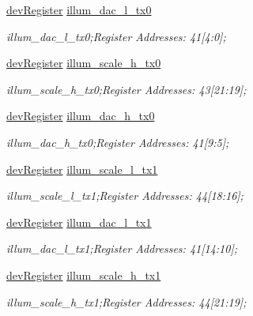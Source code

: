 \begin{DoxyCompactItemize}
\mbox{\hyperlink{classdev_register}{dev\+Register}} \mbox{\hyperlink{class_o_p_t3101_registers_a101ff3855c63d5e6ded77bd6a9614ecb}{illum\+\_\+dac\+\_\+l\+\_\+tx0}}
\begin{DoxyCompactList}\small\item\em illum\+\_\+dac\+\_\+l\+\_\+tx0;Register Addresses\+: 41\mbox{[}4\+:0\mbox{]}; \end{DoxyCompactList}\item 
\mbox{\hyperlink{classdev_register}{dev\+Register}} \mbox{\hyperlink{class_o_p_t3101_registers_a8fa23b509719062c47c69c06cc535e23}{illum\+\_\+scale\+\_\+h\+\_\+tx0}}
\begin{DoxyCompactList}\small\item\em illum\+\_\+scale\+\_\+h\+\_\+tx0;Register Addresses\+: 43\mbox{[}21\+:19\mbox{]}; \end{DoxyCompactList}\item 
\mbox{\hyperlink{classdev_register}{dev\+Register}} \mbox{\hyperlink{class_o_p_t3101_registers_a3b273a77372cdd60faf67f440fc88643}{illum\+\_\+dac\+\_\+h\+\_\+tx0}}
\begin{DoxyCompactList}\small\item\em illum\+\_\+dac\+\_\+h\+\_\+tx0;Register Addresses\+: 41\mbox{[}9\+:5\mbox{]}; \end{DoxyCompactList}\item 
\mbox{\hyperlink{classdev_register}{dev\+Register}} \mbox{\hyperlink{class_o_p_t3101_registers_a1011fcbea255739483a1bf093df3fe41}{illum\+\_\+scale\+\_\+l\+\_\+tx1}}
\begin{DoxyCompactList}\small\item\em illum\+\_\+scale\+\_\+l\+\_\+tx1;Register Addresses\+: 44\mbox{[}18\+:16\mbox{]}; \end{DoxyCompactList}\item 
\mbox{\hyperlink{classdev_register}{dev\+Register}} \mbox{\hyperlink{class_o_p_t3101_registers_a0684c4eab13b03fec4a40285abea3498}{illum\+\_\+dac\+\_\+l\+\_\+tx1}}
\begin{DoxyCompactList}\small\item\em illum\+\_\+dac\+\_\+l\+\_\+tx1;Register Addresses\+: 41\mbox{[}14\+:10\mbox{]}; \end{DoxyCompactList}\item 
\mbox{\hyperlink{classdev_register}{dev\+Register}} \mbox{\hyperlink{class_o_p_t3101_registers_afa6729feab39dd93d966d11fa11f8f02}{illum\+\_\+scale\+\_\+h\+\_\+tx1}}
\begin{DoxyCompactList}\small\item\em illum\+\_\+scale\+\_\+h\+\_\+tx1;Register Addresses\+: 44\mbox{[}21\+:19\mbox{]}; \end{DoxyCompactList}\item 

\end{DoxyCompactItemize}
